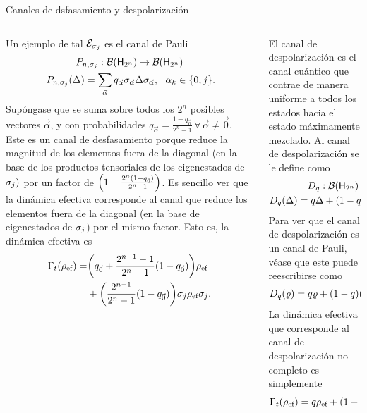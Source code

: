 \begin{frame}{Canales de dsfasamiento y despolarización}
    \begin{columns}
        \begin{column}{0.5\textwidth}
            Un ejemplo de tal $\mathcal{E}_{\sigma_{j}}$ es el canal de Pauli
\begin{equation}
    \begin{gathered}
    P_{n,\pauli{j}}:\mcB(\hilbert_{2^{n}}) \rightarrow \mcB(\hilbert_{2^{n}})\nonumber\\
    P_{n,\pauli{j}}(\Delta)=\sum_{\vec{\alpha}}q_{\vec{\alpha}}\pauli{\vec{\alpha}}\Delta\pauli{\vec{\alpha}}, \,\text{ }\, \alpha_{k}\in\{0,j\} \nonumber\rlap{.}
    \end{gathered}
\end{equation}
Supóngase que se suma sobre todos los $2^{n}$ posibles vectores $\vec{\alpha}$, y con probabilidades $q_{\vec{\alpha}}=\frac{1-q_{\vec{0} }}{2^{n}-1}\,\forall\,\vec{\alpha}\neq\vec{0}$. Este es un canal de desfasamiento porque reduce la magnitud de los elementos fuera de la diagonal (en la base de los productos tensoriales de los eigenestados de $\sigma_{j})$ por un factor de $\qty(1-\frac{2^{n}(1-q_{\vec{0}})}{2^{n}-1})$. Es sencillo ver que la dinámica efectiva corresponde al canal que reduce los elementos fuera de la diagonal (en la base de eigenestados de $\sigma_{j}$) por el mismo factor.  Esto es, la dinámica efectiva es
\begin{align}
    \Gamma_{t}(\rho_{\text{ef}})=&\qty(q_{\vec{0}}+\frac{2^{n-1}-1}{2^{n}-1}(1-q_{\vec{0}}))\rho_{\text{ef}}\nonumber\\
    &+\qty(\frac{2^{n-1}}{2^{n}-1}(1-q_{\vec{0}}))\sigma_{j}\rho_{\text{ef}}\sigma_{j}.\nonumber
\end{align}
        \end{column}
        \begin{column}{0.5\textwidth}
            El canal de despolarización es el canal cuántico que contrae de manera uniforme a todos los estados hacia el estado máximamente mezclado. Al canal de despolarización se le define como
\begin{gather}\label{eq:DepolarizingChannelN}
    D_{q}:\mcB(\hilbert_{2^{n}}) \rightarrow \mcB(\hilbert_{2^{n}})\nonumber\\
    D_{q}(\Delta)=q\Delta+(1-q)\Id_{2^{n}}\Tr(\Delta)\rlap{.}
\end{gather}
Para ver que el canal de despolarización es un canal de Pauli, véase que este puede reescribirse como 
\begin{equation}
    D_{q}(\varrho)=q\varrho+(1-q)\qty(P_{\sigma_{1}}\circ P_{\sigma_{3}})(\varrho).\nonumber
\end{equation}
La dinámica efectiva que corresponde al canal de despolarización no completo es simplemente
\begin{equation}
    \Gamma_{t}(\rho_{\ef})=q\rho_{\ef}+(1-q)\Id_{2}.\nonumber
\end{equation}
        \end{column}
    \end{columns}
\end{frame}

